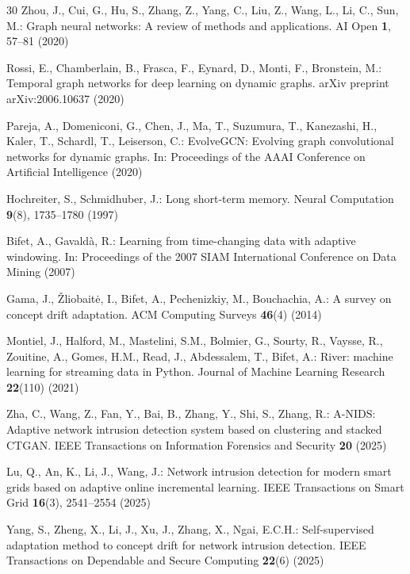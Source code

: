 \documentclass[twocolumn]{llncs}
\begin{document}
\begin{thebibliography}{30}
Zhou, J., Cui, G., Hu, S., Zhang, Z., Yang, C., Liu, Z., Wang, L., Li, C., Sun, M.: Graph neural
networks: A review of methods and applications. AI Open \textbf{1}, 57--81 (2020)

Rossi, E., Chamberlain, B., Frasca, F., Eynard, D., Monti, F., Bronstein, M.: Temporal graph
networks for deep learning on dynamic graphs. arXiv preprint arXiv:2006.10637 (2020)

Pareja, A., Domeniconi, G., Chen, J., Ma, T., Suzumura, T., Kanezashi, H., Kaler, T., Schardl, T.,
Leiserson, C.: EvolveGCN: Evolving graph convolutional networks for dynamic graphs. In:
Proceedings of the AAAI Conference on Artificial Intelligence (2020)

Hochreiter, S., Schmidhuber, J.: Long short-term memory. Neural Computation \textbf{9}(8),
1735--1780 (1997)

Bifet, A., Gavald\`a, R.: Learning from time-changing data with adaptive windowing. In:
Proceedings of the 2007 SIAM International Conference on Data Mining (2007)

Gama, J., \v{Z}liobait\.{e}, I., Bifet, A., Pechenizkiy, M., Bouchachia, A.: A survey on concept
drift adaptation. ACM Computing Surveys \textbf{46}(4) (2014)

Montiel, J., Halford, M., Mastelini, S.M., Bolmier, G., Sourty, R., Vaysse, R., Zouitine, A.,
Gomes, H.M., Read, J., Abdessalem, T., Bifet, A.: River: machine learning for streaming data in
Python. Journal of Machine Learning Research \textbf{22}(110) (2021)

Zha, C., Wang, Z., Fan, Y., Bai, B., Zhang, Y., Shi, S., Zhang, R.: A-NIDS: Adaptive network
intrusion detection system based on clustering and stacked CTGAN. IEEE Transactions on Information
Forensics and Security \textbf{20} (2025)

Lu, Q., An, K., Li, J., Wang, J.: Network intrusion detection for modern smart grids based on
adaptive online incremental learning. IEEE Transactions on Smart Grid \textbf{16}(3), 2541--2554
(2025)

Yang, S., Zheng, X., Li, J., Xu, J., Zhang, X., Ngai, E.C.H.: Self-supervised adaptation method to
concept drift for network intrusion detection. IEEE Transactions on Dependable and Secure Computing
\textbf{22}(6) (2025)


\end{thebibliography}
\end{document}
